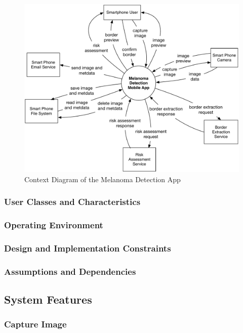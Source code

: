             \begin{figure}[H]
                \centering
                \includegraphics[width=\textwidth]{assets/requirements/ContextDiagram.pdf}
                \caption{Context Diagram of the Melanoma Detection App}
                \label{fig:partial_feature_tree}
            \end{figure}


        \subsubsection{User Classes and Characteristics}
        \subsubsection{Operating Environment}
        \subsubsection{Design and Implementation Constraints}
        \subsubsection{Assumptions and Dependencies}

    \subsection{System Features}

        \subsubsection{Capture Image}
